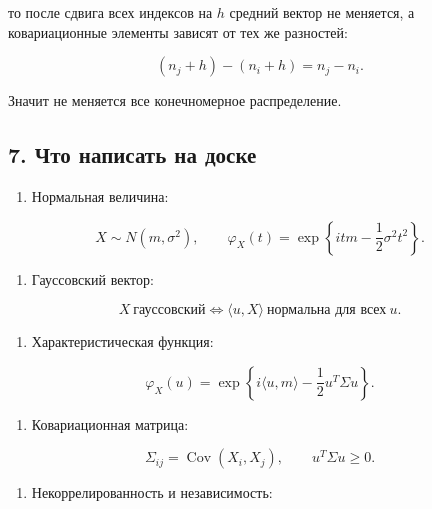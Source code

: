 \documentclass[
  11pt,
  a4paper,
]{article}
\providecommand{\tightlist}{%
  \setlength{\itemsep}{0pt}\setlength{\parskip}{0pt}}
\begin{document}
то после сдвига всех индексов на \(h\) средний вектор не меняется, а
ковариационные элементы зависят от тех же разностей:

\[
(n_j+h)-(n_i+h)=n_j-n_i.
\]

Значит не меняется все конечномерное распределение.

\subsection{7. Что написать на
доске}\label{ux447ux442ux43e-ux43dux430ux43fux438ux441ux430ux442ux44c-ux43dux430-ux434ux43eux441ux43aux435}

\begin{enumerate}
\def\labelenumi{\arabic{enumi}.}
\tightlist
\item
  Нормальная величина:
\end{enumerate}

\[
X\sim N(m,\sigma^2),
\qquad
\varphi_X(t)=\exp\left\{itm-\frac12\sigma^2t^2\right\}.
\]

\begin{enumerate}
\def\labelenumi{\arabic{enumi}.}
\setcounter{enumi}{1}
\tightlist
\item
  Гауссовский вектор:
\end{enumerate}

\[
X\ \text{гауссовский}
\Longleftrightarrow
\langle u,X\rangle\ \text{нормальна для всех}\ u.
\]

\begin{enumerate}
\def\labelenumi{\arabic{enumi}.}
\setcounter{enumi}{2}
\tightlist
\item
  Характеристическая функция:
\end{enumerate}

\[
\varphi_X(u)
=
\exp\left\{i\langle u,m\rangle-\frac12u^T\Sigma u\right\}.
\]

\begin{enumerate}
\def\labelenumi{\arabic{enumi}.}
\setcounter{enumi}{3}
\tightlist
\item
  Ковариационная матрица:
\end{enumerate}

\[
\Sigma_{ij}=\operatorname{Cov}(X_i,X_j),
\qquad
u^T\Sigma u\ge0.
\]

\begin{enumerate}
\def\labelenumi{\arabic{enumi}.}
\setcounter{enumi}{4}
\tightlist
\item
  Некоррелированность и независимость:
\end{enumerate}
\end{document}
